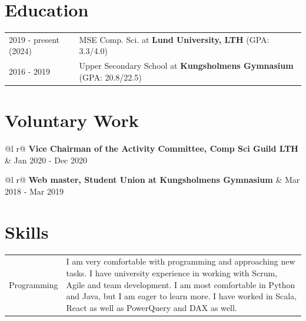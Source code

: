 \documentclass[a4paper,12pt]{article}
\begin{document}
\section{Education}
\begin{tabularx}{\linewidth}{@{}l X@{}}	
2019 - present (2024) & MSE Comp. Sci. at \textbf{Lund University, LTH} \hfill \normalsize (GPA: 3.3/4.0) \\

2016 - 2019 & Upper Secondary School at \textbf{Kungsholmens Gymnasium} \hfill (GPA: 20.8/22.5) \\ 
\end{tabularx}

\section{Voluntary Work}
\begin{tabularx}{\linewidth}{ @{}l r@{} }
\textbf{Vice Chairman of the Activity Committee, Comp
Sci Guild LTH} & \hfill Jan 2020 - Dec 2020 \\[3.75pt]
\end{tabularx}

\begin{tabularx}{\linewidth}{ @{}l r@{} }
\textbf{Web master, Student Union at Kungsholmens
Gymnasium} & \hfill Mar 2018 - Mar 2019 \\[3.75pt]
\end{tabularx}

\section{Skills}
\begin{tabularx}{\linewidth}{@{}l X@{}}
Programming &  \normalsize{I am very comfortable with programming and approaching new tasks. I have university experience in working with Scrum, Agile and team development. I am most comfortable in Python and Java, but I am eager to learn more. I have worked in Scala, React as well as PowerQuery and DAX as well.}\\
\end{tabularx}

\vfill
{}
\end{document}
